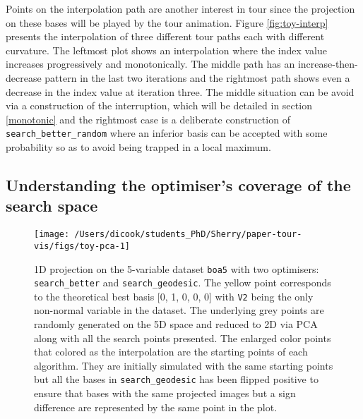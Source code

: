 \documentclass[12pt]{article}
\begin{document}
Points on the interpolation path are another interest in tour since the projection on these bases will be played by the tour animation. Figure \ref{fig:toy-interp} presents the interpolation of three different tour paths each with different curvature. The leftmost plot shows an interpolation where the index value increases progressively and monotonically. The middle path has an increase-then-decrease pattern in the last two iterations and the rightmost path shows even a decrease in the index value at iteration three. The middle situation can be avoid via a construction of the interruption, which will be detailed in section \ref{monotonic} and the rightmost case is a deliberate construction of \texttt{search\_better\_random} where an inferior basis can be accepted with some probability so as to avoid being trapped in a local maximum.

\hypertarget{understanding-the-optimisers-coverage-of-the-search-space}{%
\subsection{Understanding the optimiser's coverage of the search space}\label{understanding-the-optimisers-coverage-of-the-search-space}}

\begin{figure}

{\centering \texttt{[image: /Users/dicook/students\_PhD/Sherry/paper-tour-vis/figs/toy-pca-1]} 

}

\caption{1D projection on the 5-variable dataset \texttt{boa5} with two optimisers: \texttt{search\_better} and \texttt{search\_geodesic}. The yellow point corresponds to the theoretical best basis {[}0, 1, 0, 0, 0{]} with \texttt{V2} being the only non-normal variable in the dataset. The underlying grey points are randomly generated on the 5D space and reduced to 2D via PCA along with all the search points presented. The enlarged color points that colored as the interpolation are the starting points of each algorithm. They are initially simulated with the same starting points but all the bases in \texttt{search\_geodesic} has been flipped positive to ensure that bases with the same projected images but a sign difference are represented by the same point in the plot.}\label{fig:toy-pca}
\end{figure}
\end{document}
